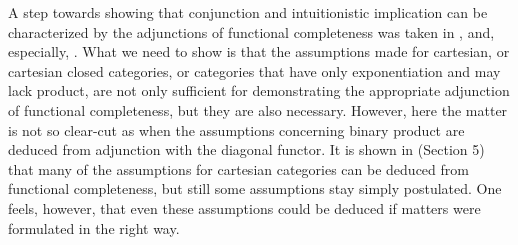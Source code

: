 \documentclass[12pt]{article}
\begin{document}
A step towards showing that conjunction and intuitionistic implication can
be characterized by the adjunctions of functional completeness was taken in 
\cite{D.92}, and, especially, \cite{DP96}. What we need to show is that the
assumptions made for cartesian, or cartesian closed categories, or
categories that have only exponentiation and may lack product, are not only
sufficient for demonstrating the appropriate adjunction of functional
completeness, but they are also necessary. However, here the matter is not
so clear-cut as when the assumptions concerning binary product are deduced
from adjunction with the diagonal functor. It is shown in \cite{DP96}
(Section 5) that many of the assumptions for cartesian categories can be
deduced from functional completeness, but still some assumptions stay simply
postulated. One feels, however, that even these assumptions could be deduced
if matters were formulated in the right way.\bigskip
\end{document}
